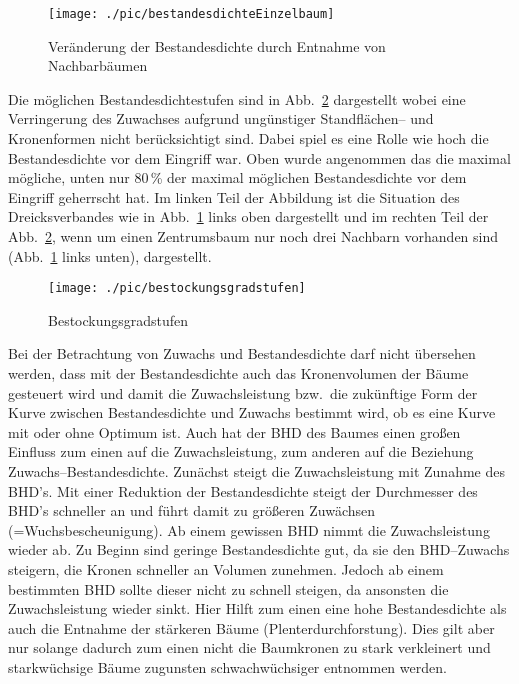 \documentclass[twocolumn]{scrartcl}
\begin{document}
\begin{figure}[htbp]
  \centering
  \texttt{[image: ./pic/bestandesdichteEinzelbaum]}
  \caption{Veränderung der Bestandesdichte durch Entnahme von Nachbarbäumen}
  \label{fig:bestandesdichteEinzelbaum}
\end{figure}

Die möglichen Bestandesdichtestufen sind in Abb.~\ref{fig:bestockungsgradstufen}
dargestellt wobei eine Verringerung des Zuwachses aufgrund ungünstiger
Standflächen-- und Kronenformen nicht berücksichtigt sind. Dabei spiel es eine
Rolle wie hoch die Bestandesdichte vor dem Eingriff war. Oben wurde angenommen
das die maximal mögliche, unten nur 80\,\% der maximal möglichen Bestandesdichte
vor dem Eingriff geherrscht hat. Im linken Teil der Abbildung ist die Situation
des Dreicksverbandes wie in Abb.~\ref{fig:bestandesdichteEinzelbaum} links oben
dargestellt und im rechten Teil der Abb.~\ref{fig:bestockungsgradstufen}, wenn
um einen Zentrumsbaum nur noch drei Nachbarn vorhanden sind
(Abb.~\ref{fig:bestandesdichteEinzelbaum} links unten), dargestellt.

\begin{figure}[htbp]
  \centering
  \texttt{[image: ./pic/bestockungsgradstufen]}
  \caption{Bestockungsgradstufen}
  \label{fig:bestockungsgradstufen}
\end{figure}

Bei der Betrachtung von Zuwachs und Bestandesdichte darf nicht übersehen werden,
dass mit der Bestandesdichte auch das Kronenvolumen der Bäume gesteuert wird und
damit die Zuwachsleistung bzw.\ die zukünftige Form der Kurve zwischen
Bestandesdichte und Zuwachs bestimmt wird, ob es eine Kurve mit oder ohne
Optimum ist. Auch hat der BHD des Baumes einen großen Einfluss zum einen auf die
Zuwachsleistung, zum anderen auf die Beziehung Zuwachs--Bestandesdichte.
Zunächst steigt die Zuwachsleistung mit Zunahme des BHD's. Mit einer Reduktion
der Bestandesdichte steigt der Durchmesser des BHD's schneller an und führt
damit zu größeren Zuwächsen (=Wuchsbescheunigung). Ab einem gewissen BHD nimmt
die Zuwachsleistung wieder ab. Zu Beginn sind geringe Bestandesdichte gut, da
sie den BHD--Zuwachs steigern, die Kronen schneller an Volumen zunehmen. Jedoch
ab einem bestimmten BHD sollte dieser nicht zu schnell steigen, da ansonsten die
Zuwachsleistung wieder sinkt. Hier Hilft zum einen eine hohe Bestandesdichte als
auch die Entnahme der stärkeren Bäume (Plenterdurchforstung). Dies gilt aber nur
solange dadurch zum einen nicht die Baumkronen zu stark verkleinert und
starkwüchsige Bäume zugunsten schwachwüchsiger entnommen werden.
\end{document}
